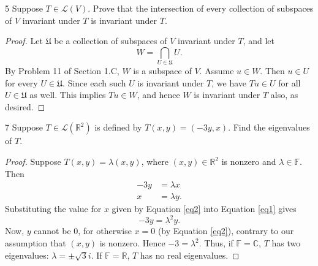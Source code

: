 \documentclass{extarticle}
\newenvironment{problem}[1]{\begin{prob*}{#1}{}}{\end{prob*}}
\newcommand{\R}{\mathbb{R}}
\newcommand{\C}{\mathbb{C}}
\newcommand{\F}{\mathbb{F}}
\newcommand{\Hom}{\mathcal{L}}
\begin{document}
\begin{problem}{5}
Suppose $T\in\Hom(V)$.  Prove that the intersection of every collection of subspaces of $V$ invariant under $T$ is invariant under $T$.
\end{problem}
\begin{proof}
Let $\mathfrak{U}$ be a collection of subspaces of $V$ invariant under $T$, and let 
\begin{equation*}
W = \bigcap_{U\in\mathfrak{U}} U.
\end{equation*}
By Problem 11 of Section 1.C, $W$ is a subspace of $V$.  Assume $u\in W$.  Then $u \in U$ for every $U\in\mathfrak{U}$.  Since each such $U$ is invariant under $T$, we have $Tu\in U$ for all $U\in\mathfrak{U}$ as well.  This implies $Tu\in W$, and hence $W$ is invariant under $T$ also, as desired.
\end{proof}

\begin{problem}{7}
Suppose $T\in\Hom(\R^2)$ is defined by $T(x,y)=(-3y,x)$.  Find the eigenvalues of $T$.
\end{problem}
\begin{proof}
Suppose $T(x,y) = \lambda(x,y)$, where $(x, y) \in\R^2$ is nonzero and $\lambda\in\F$.  Then
\begin{align}
-3y &= \lambda x \label{eq1}\\
x &= \lambda y. \label{eq2}
\end{align}
Substituting the value for $x$ given by Equation \ref{eq2} into Equation \ref{eq1} gives
\begin{equation*}
-3y = \lambda^2y.
\end{equation*}
Now, $y$ cannot be $0$, for otherwise $x=0$ (by Equation \ref{eq2}), contrary to our assumption that $(x,y)$ is nonzero.  Hence $-3 = \lambda ^2$.  Thus, if $\F = \C$, $T$ has two eigenvalues: $\lambda = \pm \sqrt{3}i$.  If $\F = \R$, $T$ has no real eigenvalues.
\end{proof}
\end{document}
